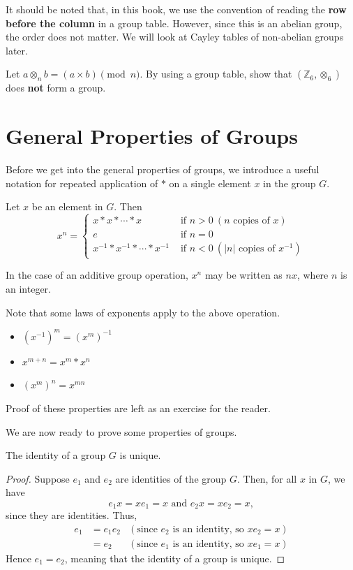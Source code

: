 It should be noted that, in this book, we use the convention of reading the \textbf{row before the column} in a group table. However, since this is an abelian group, the order does not matter. We will look at Cayley tables of non-abelian groups later.

\begin{exercise}
    Let $a \otimes_n b = (a \times b) \pmod{n}$. By using a group table, show that $(\mathbb{Z}_6, \otimes_6)$ does \textbf{not} form a group.
\end{exercise}

\section{General Properties of Groups}
Before we get into the general properties of groups, we introduce a useful notation for repeated application of $\ast$ on a single element $x$ in the group $G$.
\begin{definition}
    Let $x$ be an element in $G$. Then
    \[
        x^n =
        \begin{cases}
            x\ast x\ast \cdots \ast x & \text{ if } n > 0 \ (n\text{ copies of }x)\\
            e & \text{ if } n=0 \\
            x^{-1}\ast x^{-1}\ast \cdots \ast x^{-1} & \text{ if } n<0 \ (|n|\text{ copies of }x^{-1})
        \end{cases}
    \]
\end{definition}
\begin{remark}
    In the case of an additive group operation, $x^n$ may be written as $nx$, where $n$ is an integer.
\end{remark}

Note that some laws of exponents apply to the above operation.
\begin{itemize}
    \item $\left(x^{-1}\right)^m = \left(x^m\right)^{-1}$
    \item $x^{m+n} = x^m \ast x^n$
    \item $\left(x^m\right)^n = x^{mn}$
\end{itemize}
Proof of these properties are left as an exercise for the reader.

We are now ready to prove some properties of groups.
\begin{proposition}
    The identity of a group $G$ is unique.
\end{proposition}
\begin{proof}
    Suppose $e_1$ and $e_2$ are identities of the group $G$. Then, for all $x$ in $G$, we have
    \[
        e_1x = xe_1 = x \text{ and } e_2x = xe_2 = x,
    \]
    since they are identities. Thus,
    \begin{align*}
        e_1 &= e_1e_2 & (\text{since } e_2 \text{ is an identity, so } xe_2 = x)\\
        &= e_2 & (\text{since } e_1 \text{ is an identity, so } xe_1 = x)
    \end{align*}
    Hence $e_1 = e_2$, meaning that the identity of a group is unique.
\end{proof}

